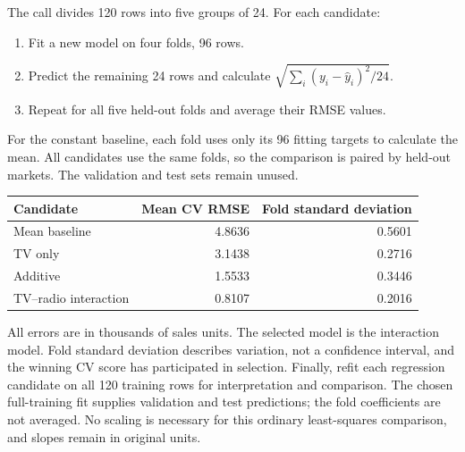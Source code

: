 The call  divides 120 rows into five groups of 24. For each candidate:
\begin{enumerate}
\item Fit a new model on four folds, 96 rows.
\item Predict the remaining 24 rows and calculate $\sqrt{\sum_i(y_i-\hat y_i)^2/24}$.
\item Repeat for all five held-out folds and average their RMSE values.
\end{enumerate}
For the constant baseline, each fold uses only its 96 fitting targets to calculate the mean. All candidates use the same folds, so the comparison is paired by held-out markets. The validation and test sets remain unused.
\begin{center}
\begin{tabular}{lrr}\toprule
Candidate&Mean CV RMSE&Fold standard deviation\\\midrule
Mean baseline&4.8636&0.5601\\
TV only&3.1438&0.2716\\
Additive&1.5533&0.3446\\
TV--radio interaction&0.8107&0.2016\\\bottomrule
\end{tabular}
\end{center}
All errors are in thousands of sales units. The selected model is the interaction model. Fold standard deviation describes variation, not a confidence interval, and the winning CV score has participated in selection.
Finally, refit each regression candidate on all 120 training rows for interpretation and comparison. The chosen full-training fit supplies validation and test predictions; the fold coefficients are not averaged. No scaling is necessary for this ordinary least-squares comparison, and slopes remain in original units.

